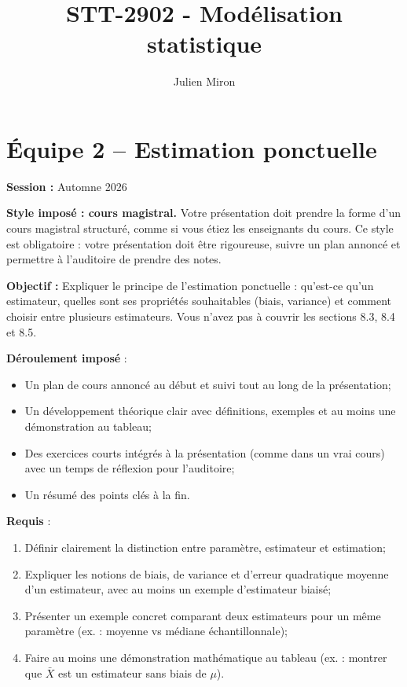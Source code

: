 \documentclass{article}
\title{STT-2902 - Modélisation statistique}
\author{Julien Miron}
\begin{document}
\section*{Équipe 2 – Estimation ponctuelle}

\textbf{Session :} Automne 2026

\textbf{Style imposé : cours magistral.} Votre présentation doit prendre la forme d'un cours magistral structuré, comme si vous étiez les enseignants du cours. Ce style est obligatoire : votre présentation doit être rigoureuse, suivre un plan annoncé et permettre à l'auditoire de prendre des notes.

\vspace{0.5cm}
\textbf{Objectif :} Expliquer le principe de l'estimation ponctuelle : qu'est-ce qu'un estimateur, quelles sont ses propriétés souhaitables (biais, variance) et comment choisir entre plusieurs estimateurs. Vous n'avez pas à couvrir les sections 8.3, 8.4 et 8.5.

\vspace{0.5cm}
\textbf{Déroulement imposé} :
\begin{itemize}
    \item Un plan de cours annoncé au début et suivi tout au long de la présentation;
    \item Un développement théorique clair avec définitions, exemples et au moins une démonstration au tableau;
    \item Des exercices courts intégrés à la présentation (comme dans un vrai cours) avec un temps de réflexion pour l'auditoire;
    \item Un résumé des points clés à la fin.
\end{itemize}

\vspace{0.5cm}
\textbf{Requis} :
\begin{enumerate}
    \item Définir clairement la distinction entre paramètre, estimateur et estimation;
    \item Expliquer les notions de biais, de variance et d'erreur quadratique moyenne d'un estimateur, avec au moins un exemple d'estimateur biaisé;
    \item Présenter un exemple concret comparant deux estimateurs pour un même paramètre (ex. : moyenne vs médiane échantillonnale);
    \item Faire au moins une démonstration mathématique au tableau (ex. : montrer que $\bar{X}$ est un estimateur sans biais de $\mu$).
\end{enumerate}
\end{document}
